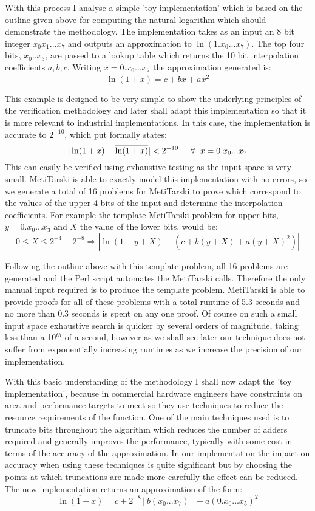 \documentclass[a4]{article}
\begin{document}
With this process I analyse a simple 'toy implementation' which is based on the outline given above for computing the natural logarithm which should demonstrate the methodology. The implementation takes as an input an 8 bit integer $x_0x_1...x_7$ and outputs an approximation to $\ln(1.x_0...x_7)$. The top four bits, $x_0..x_3$, are passed to a lookup table which returns the 10 bit interpolation coefficients $a, b, c$. Writing $x=0.x_0...x_7$ the approximation generated is:
$$ \overline{\ln(1+x)}=c + bx +ax^2 $$

This example is designed to be very simple to show the underlying principles of the verification methodology and later shall adapt this implementation so that it is more relevant to industrial implementations. In this case, the implementation is accurate to $2^{-10}$, which put formally states:
$$|\ln(1+x)-\overline{\ln(1+x)}|<2^{-10}\hspace{0.5cm} \forall \hspace{0.2cm} x= 0.x_0...x_7 $$
This can easily be verified using exhaustive testing as the input space is very small. MetiTarski is able to exactly model this implementation with no errors, so we generate a total of 16 problems for MetiTarski to prove which correspond to the values of the upper 4 bits of the input and determine the interpolation coefficients. For example the template MetiTarski problem for upper bits, $y=0.x_0...x_3$ and $X$ the value of the lower bits, would be:
$$ 0\le X \le 2^{-4}-2^{-8} \Rightarrow |\ln(1+y+X)-(c+b(y+X)+a(y+X)^2)|$$

Following the outline above with this template problem, all 16 problems are generated and the Perl script automates the MetiTarski calls. Therefore the only manual input required is to produce the template problem. MetiTarski is able to provide proofs for all of these problems with a total runtime of 5.3 seconds and no more than 0.3 seconds is spent on any one proof. Of course on such a small input space exhaustive search is quicker by several orders of magnitude, taking less than a 10$^{th}$ of a second, however as we shall see later our technique does not suffer from exponentially increasing runtimes as we increase the precision of our implementation.


With this basic understanding of the methodology I shall now adapt the 'toy implementation', because in commercial hardware engineers have constraints on area and performance targets to meet so they use techniques to reduce the resource requirements of the function. One of the main techniques used is to truncate bits throughout the algorithm which reduces the number of adders required and generally improves the performance, typically with some cost in terms of the accuracy of the approximation. In our implementation the impact on accuracy when using these techniques is quite significant but by choosing the points at which truncations are made more carefully the effect can be reduced. The new implementation returns an approximation of the form:  
$$ \overline{\ln(1+x)}=c + 2^{-8}\left \lfloor{b(x_0...x_7)}\right \rfloor +a(0.x_0...x_5)^2 $$
\end{document}
